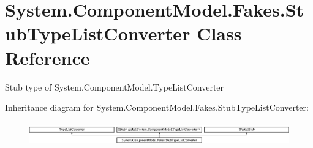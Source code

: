\hypertarget{class_system_1_1_component_model_1_1_fakes_1_1_stub_type_list_converter}{\section{System.\-Component\-Model.\-Fakes.\-Stub\-Type\-List\-Converter Class Reference}
\label{class_system_1_1_component_model_1_1_fakes_1_1_stub_type_list_converter}
}


Stub type of System.\-Component\-Model.\-Type\-List\-Converter 


Inheritance diagram for System.\-Component\-Model.\-Fakes.\-Stub\-Type\-List\-Converter\-:\begin{figure}[H]
\begin{center}
\leavevmode
\includegraphics[height=1.037037cm]{class_system_1_1_component_model_1_1_fakes_1_1_stub_type_list_converter}
\end{center}
\end{figure}
